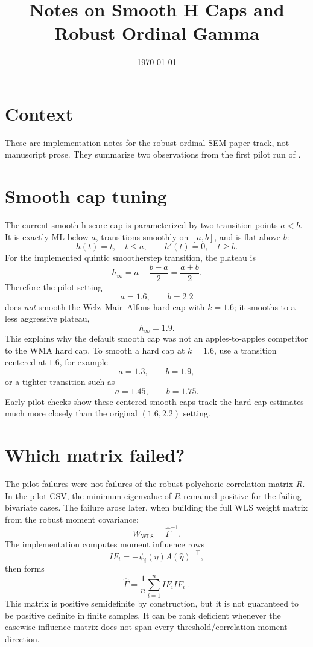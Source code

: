 \documentclass[11pt]{article}
\title{Notes on Smooth H Caps and Robust Ordinal Gamma}
\author{}
\date{\today}
\newcommand{\Ghat}{\widehat\Gamma}
\begin{document}
\maketitle

\section*{Context}

These are implementation notes for the robust ordinal SEM paper track, not
manuscript prose. They summarize two observations from the first pilot run of
.

\section*{Smooth cap tuning}

The current smooth h-score cap is parameterized by two transition points
$a < b$. It is exactly ML below $a$, transitions smoothly on $[a,b]$, and is
flat above $b$:
\[
  h(t)=t,\quad t \le a,
  \qquad
  h'(t)=0,\quad t \ge b.
\]
For the implemented quintic smootherstep transition, the plateau is
\[
  h_\infty = a + \frac{b-a}{2} = \frac{a+b}{2}.
\]
Therefore the pilot setting
\[
  a=1.6,\qquad b=2.2
\]
does \emph{not} smooth the Welz--Mair--Alfons hard cap with $k=1.6$; it
smooths to a less aggressive plateau,
\[
  h_\infty = 1.9.
\]
This explains why the default smooth cap was not an apples-to-apples
competitor to the WMA hard cap. To smooth a hard cap at $k=1.6$, use a
transition centered at $1.6$, for example
\[
  a=1.3,\qquad b=1.9,
\]
or a tighter transition such as
\[
  a=1.45,\qquad b=1.75.
\]
Early pilot checks show these centered smooth caps track the hard-cap estimates
much more closely than the original $(1.6,2.2)$ setting.

\section*{Which matrix failed?}

The pilot failures were not failures of the robust polychoric correlation
matrix $R$. In the pilot CSV, the minimum eigenvalue of $R$ remained positive
for the failing bivariate cases. The failure arose later, when building the
full WLS weight matrix from the robust moment covariance:
\[
  W_{\mathrm{WLS}} = \Ghat^{-1}.
\]
The implementation computes moment influence rows
\[
  IF_i = -\psi_i(\widehat\eta) A(\widehat\eta)^{-\top},
\]
then forms
\[
  \Ghat = \frac{1}{n}\sum_{i=1}^n IF_i IF_i^\top .
\]
This matrix is positive semidefinite by construction, but it is not guaranteed
to be positive definite in finite samples. It can be rank deficient whenever
the casewise influence matrix does not span every threshold/correlation moment
direction.
\end{document}
